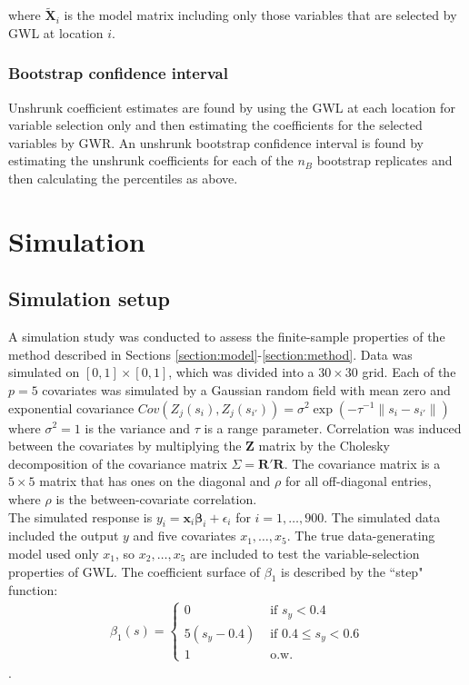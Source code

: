 \documentclass[authoryear, review, 11pt]{elsarticle}
\begin{document}
		where $\tilde{\bm{X}}_i$ is the model matrix including only those variables that are selected by GWL at location $i$.
		
		\subsubsection{Bootstrap confidence interval}
		
	 Unshrunk coefficient estimates are found by using the GWL at each location for variable selection only and then estimating the coefficients for the selected variables by GWR. An unshrunk bootstrap confidence interval is found by estimating the unshrunk coefficients for each of the $n_B$ bootstrap replicates and then calculating the percentiles as above.\\
	 



\section{Simulation}
	\subsection{Simulation setup}
	A simulation study was conducted to assess the finite-sample properties of the method described in Sections \ref{section:model}-\ref{section:method}. Data was simulated on $[0,1] \times [0,1]$, which was divided into a $30 \times 30$ grid. Each of the $p=5$ covariates was simulated by a Gaussian random field with mean zero and exponential covariance $Cov \left(Z_j(s_i), Z_j(s_{i'}) \right) = \sigma^2 \exp{\left( -\tau^{-1} \|s_i - s_{i'} \| \right)}$ where $\sigma^2=1$ is the variance and $\tau$ is a range parameter. Correlation was induced between the covariates by multiplying the $\bm{Z}$ matrix by the Cholesky decomposition of the covariance matrix $\Sigma = \bm{R}'\bm{R}$. The covariance matrix is a $5 \times 5$ matrix that has ones on the diagonal and $\rho$ for all off-diagonal entries, where $\rho$ is the between-covariate correlation.\\
		
	The simulated response is $y_i = \bm{x}_i \bm{\beta}_i + \epsilon_i$ for $i=1, \dots, 900$. The simulated data included the output $y$ and five covariates $x_1, \dots, x_5$. The true data-generating model used only $x_1$, so $x_2, \dots, x_5$ are included to test the variable-selection properties of GWL. The coefficient surface of $\beta_1$ is described by the ``step" function:
	\begin{eqnarray}
		\beta_1(s) = \begin{cases} 0 &\mbox{ if } s_y<0.4 \\ 5(s_y-0.4) &\mbox{ if } 0.4 \leq s_y<0.6 \\ 1 &\mbox{ o.w.} \end{cases}
	\end{eqnarray}.\\
		
\end{document}
